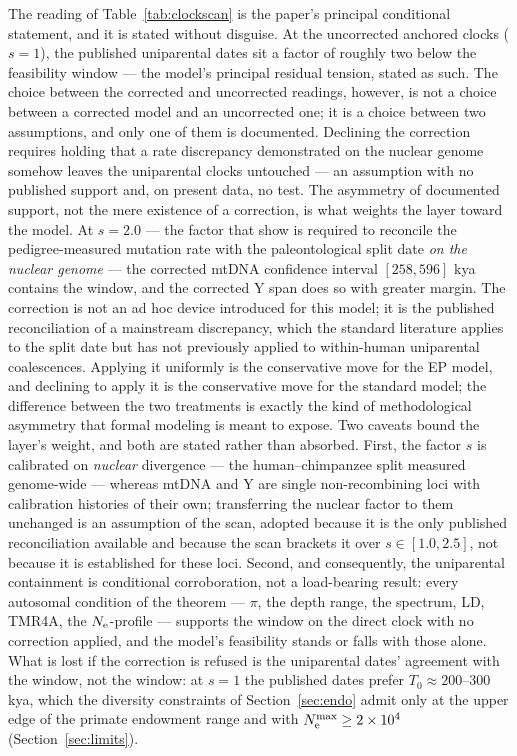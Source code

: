 The reading of Table~\ref{tab:clockscan} is the paper's principal
conditional statement, and it is stated without disguise. At the
uncorrected anchored clocks ($s = 1$), the published uniparental dates sit
a factor of roughly two below the feasibility window --- the model's
principal residual tension, stated as such. The choice between the
corrected and uncorrected readings, however, is not a choice between a
corrected model and an uncorrected one; it is a choice between two
assumptions, and only one of them is documented. Declining the correction
requires holding that a rate discrepancy demonstrated on the nuclear
genome somehow leaves the uniparental clocks untouched --- an assumption
with no published support and, on present data, no test. The asymmetry of
documented support, not the mere existence of a correction, is what
weights the layer toward the model. At $s = 2.0$ --- the
factor that \citet{Scally2012} show is required to reconcile the
pedigree-measured mutation rate with the paleontological split date
\emph{on the nuclear genome} --- the corrected mtDNA confidence interval
$[258, 596]$ kya contains the window, and the corrected Y span does so
with greater margin. The correction is not an ad hoc device introduced for
this model; it is the published reconciliation of a mainstream discrepancy,
which the standard literature applies to the split date but has not
previously applied to within-human uniparental coalescences. Applying it
uniformly is the conservative move for the EP model, and declining to apply
it is the conservative move for the standard model; the difference between
the two treatments is exactly the kind of methodological asymmetry that
formal modeling is meant to expose. Two caveats bound the layer's weight,
and both are stated rather than absorbed. First, the factor $s$ is
calibrated on \emph{nuclear} divergence --- the human--chimpanzee split
measured genome-wide --- whereas mtDNA and Y are single non-recombining
loci with calibration histories of their own; transferring the nuclear
factor to them unchanged is an assumption of the scan, adopted because it
is the only published reconciliation available and because the scan
brackets it over $s \in [1.0, 2.5]$, not because it is established for
these loci. Second, and consequently, the uniparental containment is
conditional corroboration, not a load-bearing result: every autosomal
condition of the theorem --- $\pi$, the depth range, the spectrum, LD,
TMR4A, the $N_{\mathrm{e}}$-profile --- supports the window on the direct clock with
no correction applied, and the model's feasibility stands or falls with
those alone. What is lost if the correction is refused is the uniparental
dates' agreement with the window, not the window: at $s = 1$ the published
dates prefer $T_0 \approx 200$--$300$ kya, which the diversity constraints
of Section~\ref{sec:endo} admit only at the upper edge of the primate
endowment range and with $N_{\mathrm{e}}^{\max} \ge 2\times10^4$
(Section~\ref{sec:limits}).

